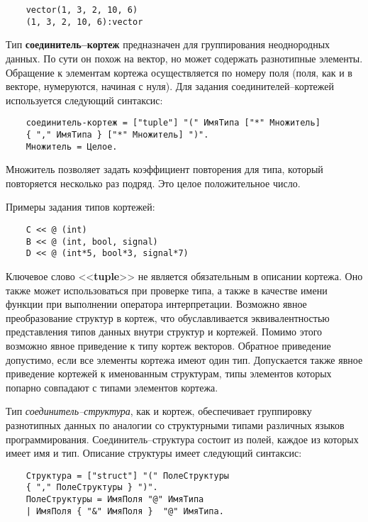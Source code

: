 {\begin{verbatim}
    vector(1, 3, 2, 10, 6)
    (1, 3, 2, 10, 6):vector
\end{verbatim}

Тип \textbf{соединитель--кортеж} предназначен для группирования неоднородных данных. По сути он похож на вектор, но может содержать разнотипные элементы. Обращение к элементам кортежа осуществляется по номеру поля (поля, как и в векторе, нумеруются, начиная с нуля). Для задания соединителей--кортежей используется следующий синтаксис:

\begin{verbatim}
    соединитель-кортеж = ["tuple"] "(" ИмяТипа ["*" Множитель]
    { "," ИмяТипа } ["*" Множитель] ")".
    Множитель = Целое.
\end{verbatim}

Множитель позволяет задать коэффициент повторения для типа, который повторяется несколько раз подряд. Это целое положительное число.

Примеры задания типов кортежей:

\begin{verbatim}
    С << @ (int)
    В << @ (int, bool, signal)
    D << @ (int*5, bool*3, signal*7)
\end{verbatim}

Ключевое слово <<\textbf{tuple}>> не является обязательным в описании кортежа. Оно также может использоваться при проверке типа, а также в качестве имени функции при выполнении оператора интерпретации. Возможно явное преобразование структур в кортеж, что обуславливается эквивалентностью представления типов данных внутри структур и кортежей. Помимо этого возможно явное приведение к типу кортеж векторов. Обратное приведение допустимо, если все элементы кортежа имеют один тип. Допускается также явное приведение кортежей к именованным структурам, типы элементов которых попарно совпадают с типами элементов кортежа.

Тип \textit{соединитель--структура}, как и кортеж, обеспечивает группировку разнотипных данных по аналогии со структурными типами различных языков программирования. Соединитель--структура состоит из полей, каждое из которых имеет имя и тип. Описание структуры имеет следующий синтаксис:

\begin{verbatim}
    Структура = ["struct"] "(" ПолеСтруктуры
    { "," ПолеСтруктуры } ")".
    ПолеСтруктуры = ИмяПоля "@" ИмяТипа
    | ИмяПоля { "&" ИмяПоля }  "@" ИмяТипа.
\end{verbatim}

}
